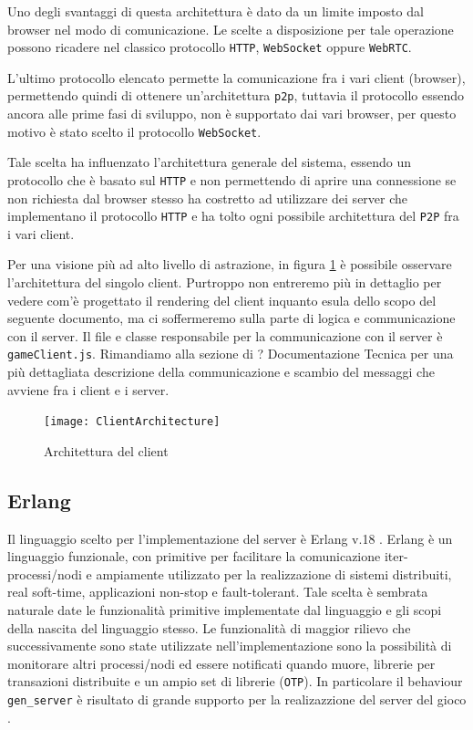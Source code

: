 \documentclass[paper=a4, fontsize=11pt]{scrartcl} %
\numberwithin{equation}{section} %
\numberwithin{figure}{section} %
\numberwithin{table}{section} %
\begin{document}
Uno degli svantaggi di questa architettura è dato da un limite imposto dal browser nel modo di comunicazione. Le scelte a disposizione per tale operazione possono ricadere nel classico protocollo \texttt{HTTP}, \texttt{WebSocket} oppure \texttt{WebRTC}.

L'ultimo protocollo elencato permette la comunicazione fra i vari client (browser), permettendo quindi di ottenere un'architettura \texttt{p2p}, tuttavia il
protocollo essendo ancora alle prime fasi di sviluppo, non è supportato dai vari browser, per questo motivo è stato scelto il protocollo \texttt{WebSocket}. 

Tale scelta ha influenzato l'architettura
generale del sistema, essendo un protocollo che è basato sul \texttt{HTTP} e non permettendo di aprire una connessione se non richiesta dal browser stesso ha costretto
ad utilizzare dei server che implementano il protocollo \texttt{HTTP} e ha tolto ogni possibile architettura del \texttt{P2P} fra i vari client.


Per una visione più ad alto livello di astrazione, in figura \ref{ClientArc} è possibile osservare l'architettura del singolo client.
Purtroppo non entreremo più in dettaglio per vedere com'è progettato il rendering del client inquanto esula dello scopo del seguente documento, 
ma ci soffermeremo sulla parte di logica e communicazione con il server. Il file e classe responsabile per la communicazione con il server è \texttt{gameClient.js}.
Rimandiamo alla sezione di ? Documentazione Tecnica per una più dettagliata descrizione della communicazione e scambio del messaggi che avviene fra i client e i server.

\begin{figure}
\centering
\texttt{[image: ClientArchitecture]}
\caption{Architettura del client}
\label{ClientArc}
\end{figure}

\subsection{Erlang}
Il linguaggio scelto per l'implementazione del server è Erlang v.18 \cite{erlang}. Erlang è un linguaggio funzionale, con primitive
per facilitare la comunicazione iter-processi/nodi e ampiamente utilizzato per la realizzazione di sistemi distribuiti, real soft-time,
applicazioni non-stop e fault-tolerant.
Tale scelta è sembrata naturale date le funzionalità primitive implementate dal linguaggio e gli scopi della nascita del linguaggio stesso.
Le funzionalità di maggior rilievo che successivamente sono state utilizzate nell'implementazione sono la possibilità di monitorare 
altri processi/nodi ed essere notificati quando muore, librerie per transazioni distribuite e
un ampio set di librerie (\texttt{OTP}). In particolare il behaviour \texttt{gen\_server} è risultato
di grande supporto per la realizazzione del server del gioco \cite{erlang-monitor, erlang-supervisor, erlang-mnesia, erlang-gen-server}.
\end{document}
